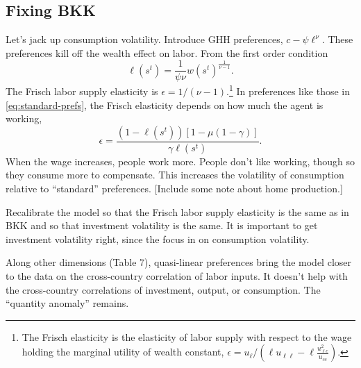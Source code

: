 \documentclass[11pt,pdftex,twoside,letterpaper]{exam}
\begin{document}
 \subsection{Fixing BKK}
 Let's jack up consumption volatility. Introduce GHH preferences, $c-\psi\ell^\nu$. These preferences kill off the wealth effect on labor. From the first order condition
 \begin{equation}\label{}
 \ell(s^t)=\frac{1}{\psi\nu}w(s^t)^\frac{1}{\nu-1}.
 \end{equation}
 The Frisch labor supply elasticity  is $\epsilon=1/(\nu-1)$.\footnote{The Frisch elasticity is the elasticity of labor supply with respect to the wage holding the marginal utility of wealth constant, $\epsilon = u_\ell/(\ell u_{\ell\ell}-\ell\frac{u_{\ell c}^2}{u_{cc}})$. } In preferences like those in \eqref{eq:standard-prefs}, the Frisch elasticity depends on how much the agent is working,
 \begin{equation}\label{}
   \epsilon = \frac{(1-\ell(s^t))[1-\mu(1-\gamma)]}{\gamma\ell(s^t)}.
 \end{equation}
 When the wage increases, people work more. People don't like working, though so they consume more to compensate. This increases the volatility of consumption relative to ``standard'' preferences. [Include some note about home production.]

 Recalibrate the model so that the Frisch labor supply elasticity is the same as in BKK and so that investment volatility is the same. It is important to get investment volatility right, since the focus in on consumption volatility.

 Along other dimensions (Table 7), quasi-linear preferences bring the model closer to the data on the cross-country correlation of labor inputs. It doesn't help with the cross-country correlations of investment, output, or consumption. The ``quantity anomaly'' remains.
\end{document}
